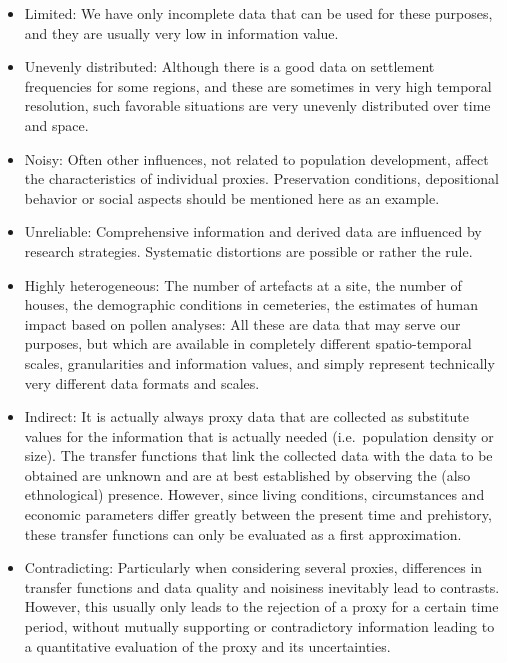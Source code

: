 \documentclass[
]{article}
\providecommand{\tightlist}{%
  \setlength{\itemsep}{0pt}\setlength{\parskip}{0pt}}
\begin{document}
\begin{itemize}
\tightlist
\item
  Limited: We have only incomplete data that can be used for these purposes, and they are usually very low in information value.
\item
  Unevenly distributed: Although there is a good data on settlement frequencies for some regions, and these are sometimes in very high temporal resolution, such favorable situations are very unevenly distributed over time and space.
\item
  Noisy: Often other influences, not related to population development, affect the characteristics of individual proxies. Preservation conditions, depositional behavior or social aspects should be mentioned here as an example.
\item
  Unreliable: Comprehensive information and derived data are influenced by research strategies. Systematic distortions are possible or rather the rule.
\item
  Highly heterogeneous: The number of artefacts at a site, the number of houses, the demographic conditions in cemeteries, the estimates of human impact based on pollen analyses: All these are data that may serve our purposes, but which are available in completely different spatio-temporal scales, granularities and information values, and simply represent technically very different data formats and scales.
\item
  Indirect: It is actually always proxy data that are collected as substitute values for the information that is actually needed (i.e.~population density or size). The transfer functions that link the collected data with the data to be obtained are unknown and are at best established by observing the (also ethnological) presence. However, since living conditions, circumstances and economic parameters differ greatly between the present time and prehistory, these transfer functions can only be evaluated as a first approximation.
\item
  Contradicting: Particularly when considering several proxies, differences in transfer functions and data quality and noisiness inevitably lead to contrasts. However, this usually only leads to the rejection of a proxy for a certain time period, without mutually supporting or contradictory information leading to a quantitative evaluation of the proxy and its uncertainties.
\end{itemize}
\end{document}
